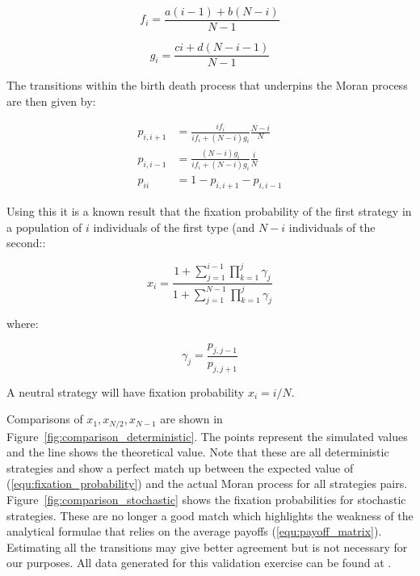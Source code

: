 \documentclass{article}
\begin{document}
\begin{equation}\label{equ:expected_payoff_one}
    f_i = \frac{a(i - 1) + b(N - i)}{N - 1}
\end{equation}

\begin{equation}\label{equ:expected_payoff_two}
    g_i = \frac{ci + d(N - i - 1)}{N - 1}
\end{equation}

%
%

The transitions within the birth death process that underpins the Moran process
are then given by:

\begin{align}
    p_{i, i+1}&= \frac{if_i}{if_i+(N-i)g_i}\frac{N-i}{N}\label{equ:p_up}\\
    p_{i, i-1}&= \frac{(N-i)g_i}{if_i+(N-i)g_i}\frac{i}{N}\label{equ:p_down}\\
    p_{ii} &= 1 - p_{i, i+1} - p_{i, i-1}\label{equ:p_stay}
\end{align}

Using this it is a known result \cite{Nowak2017} that the fixation probability
of the first strategy in a population of \(i\) individuals of the first type
(and \(N-i\) individuals of the second::

\begin{equation}\label{equ:fixation_probability}
x_i = \frac{1 + \sum_{j=1}^{i-1}\prod_{k=1}^{j}\gamma_j}{1 + \sum_{j=1}^{N-1}
      \prod_{k=1}^{j}\gamma_j}
\end{equation}

where:

\[
\gamma_j = \frac{p_{j, j-1}}{p_{j, j+1}}
\]

A neutral strategy will have fixation probability $x_i = i/N$.

Comparisons of \(x_1, x_{N/2}, x_{N-1}\) are shown in
Figure~\ref{fig:comparison_deterministic}. The points represent the simulated
values and the line shows the theoretical value. Note that these are all
deterministic strategies and show a perfect match up between the expected value
of (\ref{equ:fixation_probability}) and the actual Moran process for all
strategies pairs. Figure~\ref{fig:comparison_stochastic} shows the fixation probabilities for
stochastic strategies. These are no longer a good match which highlights the
weakness of the analytical formulae that relies on the average payoffs
(\ref{equ:payoff_matrix}). Estimating all the transitions may give better agreement
but is not necessary for our purposes. All data generated for this validation exercise can be found
at \cite{data}.
\end{document}
